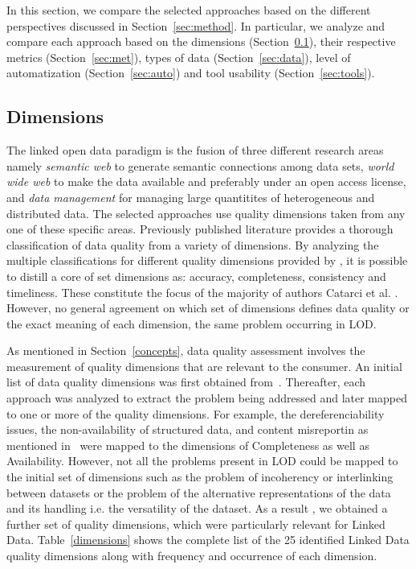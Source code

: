 In this section, we compare the selected approaches based on the different perspectives discussed in Section~\ref{sec:method}.
In particular, we analyze and compare each approach based on the dimensions (Section~\ref{sec:dim}), their respective metrics (Section~\ref{sec:met}), types of data (Section~\ref{sec:data}), level of automatization (Section~\ref{sec:auto}) and tool usability (Section~\ref{sec:tools}). 

\subsection{Dimensions}
\label{sec:dim}
The linked open data paradigm is the fusion of three different research areas namely \emph{semantic web} to generate semantic connections among data sets,  \emph{world wide web} to make the data available and preferably under an open access license, and \emph{data management} for managing large quantitites of heterogeneous and distributed data.
The selected approaches use quality dimensions taken from any one of these specific areas. 
Previously published literature provides a thorough classification of data quality from a variety of dimensions.
By analyzing the multiple classifications for different quality dimensions provided by \cite{Wand:1996, Wang:1996, Redman:1997, Jarke:2010, Bovee:2003, Naumann:2002}, it is possible to distill a core of set dimensions as: accuracy, completeness, consistency and timeliness. These constitute the focus of the majority of authors Catarci et al. \cite{scannapieco:2002}.
However, no general agreement on which set of dimensions defines data quality or the exact meaning of each dimension, the same problem occurring in LOD.

As mentioned in Section~\ref{concepts}, data quality assessment involves the measurement of quality dimensions that are relevant to the consumer. %
An initial list of data quality dimensions was first obtained from~\cite{Bizerthesis}.
Thereafter, each approach was analyzed to extract the problem being addressed and later mapped to one or more of the quality dimensions.
For example, the dereferenciability issues, the non-availability of structured data, and content misreportin as mentioned in~\cite{Hogan:2012} were mapped to the dimensions of Completeness as well as Availability.
However, not all the problems present in LOD could be mapped to the initial set of dimensions such as the problem of incoherency or interlinking between datasets or the problem of the alternative representations of the data and its handling i.e. the versatility of the dataset.
As a result , we obtained a further set of quality dimensions, which were particularly relevant for Linked Data.%
Table~\ref{dimensions} shows the complete list of the 25 identified Linked Data quality dimensions along with frequency and occurrence of each dimension. 


